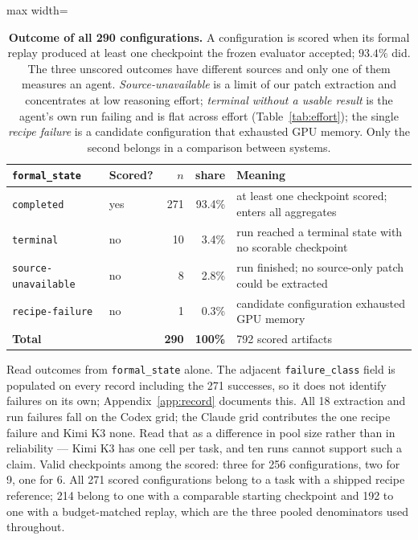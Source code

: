 \begin{table}[t]
\centering
\caption{\textbf{Outcome of all 290 configurations.} A configuration is scored when its formal
replay produced at least one checkpoint the frozen evaluator accepted; $93.4\%$ did. The three
unscored outcomes have different sources and only one of them measures an agent.
\emph{Source-unavailable} is a limit of our patch extraction and concentrates at low reasoning
effort; \emph{terminal without a usable result} is the agent's own run failing and is flat across
effort (Table~\ref{tab:effort}); the single \emph{recipe failure} is a candidate configuration
that exhausted GPU memory. Only the second belongs in a comparison between systems.}
\label{tab:lifecycle}
\small
\begin{adjustbox}{max width=\linewidth}
\begin{tabular}{llrrl}
\toprule
\textbf{\texttt{formal\_state}} & \textbf{Scored?} & \textbf{$n$} & \textbf{share} & \textbf{Meaning} \\
\midrule
\texttt{completed}          & yes & 271 & 93.4\% & at least one checkpoint scored; enters all aggregates \\
\texttt{terminal}           & no  & 10  & 3.4\%  & run reached a terminal state with no scorable checkpoint \\
\texttt{source-unavailable} & no  & 8   & 2.8\%  & run finished; no source-only patch could be extracted \\
\texttt{recipe-failure}     & no  & 1   & 0.3\%  & candidate configuration exhausted GPU memory \\
\midrule
\textbf{Total}              &     & \textbf{290} & \textbf{100\%} & 792 scored artifacts \\
\bottomrule
\end{tabular}
\end{adjustbox}
\par\vspace{2pt}
{\footnotesize Read outcomes from \texttt{formal\_state} alone. The adjacent
\texttt{failure\_class} field is populated on every record including the 271 successes, so it
does not identify failures on its own; Appendix~\ref{app:record} documents this. All 18
extraction and run failures fall on the Codex grid; the Claude grid contributes the one recipe
failure and Kimi K3 none. Read that as a difference in pool size rather than in reliability ---
Kimi K3 has one cell per task, and ten runs cannot support such a claim. Valid
checkpoints among the scored: three for 256 configurations, two for 9, one for 6. All 271
scored configurations belong to a task with a shipped recipe reference; 214 belong to one with a
comparable starting checkpoint and 192 to one with a budget-matched replay, which are the three
pooled denominators used throughout.}
\end{table}

